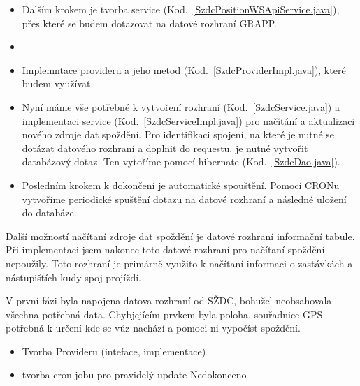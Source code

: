 \begin{itemize}
 	\setlength{\parskip}{0pt}
 	\setlength{\itemsep}{0pt}


 
	\item Dalším krokem je tvorba service (Kod.~\ref{SzdcPositionWSApiService.java}), přes které se budem dotazovat na datové rozhraní GRAPP.
 
 
	\item 
 
	\item Implemntace provideru a jeho metod (Kod.~\ref{SzdcProviderImpl.java}), které budem využívat.
 
 
	\item Nyní máme vše potřebné k vytvoření rozhraní (Kod.~\ref{SzdcService.java}) a implementaci service (Kod.~\ref{SzdcServiceImpl.java}) pro načítání a aktualizaci nového zdroje dat spoždění. Pro identifikaci spojení, na které je nutné se dotázat datového rozhraní a doplnit do requestu, je nutné vytvořit databázový dotaz. Ten vytoříme pomocí hibernate (Kod.~\ref{SzdcDao.java}).
	
	
	\item Posledním krokem k dokončení je automatické spouštění. Pomocí CRONu vytvoříme periodické spuštění dotazu na datové rozhraní a následné uložení do databáze.
	
\end{itemize} 

Další možností načítaní zdroje dat spoždění je datové rozhraní informační tabule. Při implementaci jsem nakonec toto datové rozhraní pro načítaní spoždění nepoužily. Toto rozhraní je primárně  využito k načítaní informaci o zastávkách a nástupištích kudy spoj projíždí.

V první fázi byla napojena datova rozhraní od SŽDC, bohužel neobsahovala všechna potřebná data. Chybjejícím prvkem byla poloha, souřadnice GPS potřebná k určení kde se vůz nachází a pomoci ni vypočíst spoždění.
\begin{itemize}
	\setlength{\parskip}{0pt}
	\setlength{\itemsep}{0pt}
	\item Tvorba Provideru (inteface, implementace)
	
	
	\item tvorba cron jobu pro pravidelý update
	Nedokonceno
\end{itemize}

